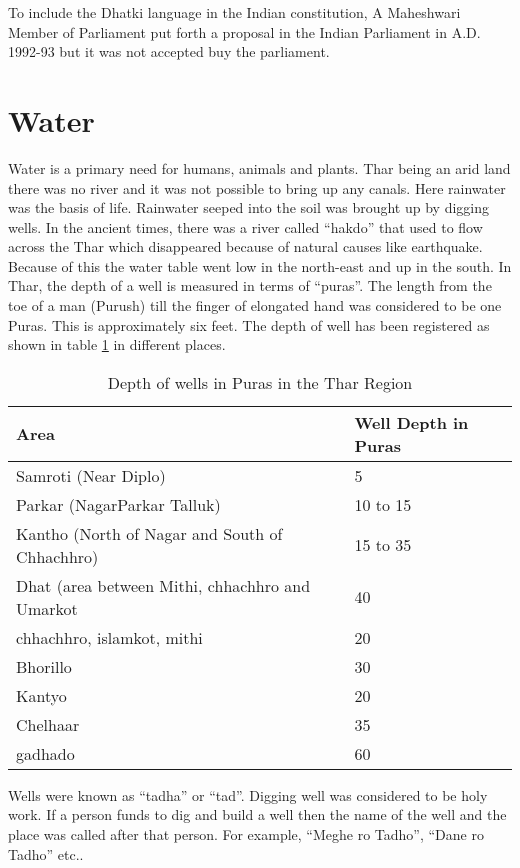 To include the Dhatki language in the Indian constitution, A Maheshwari Member
of Parliament put forth a proposal in the Indian Parliament in A.D. 1992-93 but
it was not accepted buy the parliament.

\section{Water}
Water is a primary need for humans, animals and plants. Thar being an arid land
there was no river and it was not possible to bring up any canals. Here
rainwater was the basis of life. Rainwater seeped into the soil was brought up
by digging wells. In the ancient times, there was a river called ``hakdo'' that
used to flow across the Thar which disappeared because of natural causes like
earthquake. Because of this the water table went low in the north-east and up in
the south. In Thar, the depth of a well is measured in terms of ``puras''. The
length from the toe of a man (Purush) till the finger of elongated hand was
considered to be one Puras. This is approximately six feet. The depth of well
has been registered as shown in table \ref{tbl:well} in different places.
\begin{table}
\begin{center}
\begin{tabular}{l|l}
\hline
\textbf{Area} & \textbf{Well Depth in Puras} \\
\hline
Samroti (Near Diplo) & 5 \\ 
Parkar (NagarParkar Talluk) & 10 to 15 \\ 
Kantho (North of Nagar and South of Chhachhro) & 15 to 35 \\ 
Dhat (area between Mithi, chhachhro and Umarkot & 40 \\ 
chhachhro, islamkot, mithi & 20 \\ 
Bhorillo & 30 \\ 
Kantyo & 20 \\ 
Chelhaar & 35 \\ 
gadhado & 60 \\ 
\hline
\end{tabular}
\end{center}
\caption{Depth of wells in Puras in the Thar Region}
\label{tbl:well}
\end{table}

Wells were known as ``tadha'' or ``tad''. Digging well was considered to be holy
work. If a person funds to dig and build a well then the name of the well and
the place was called after that person. For example, ``Meghe ro Tadho'', ``Dane
ro Tadho'' etc..

